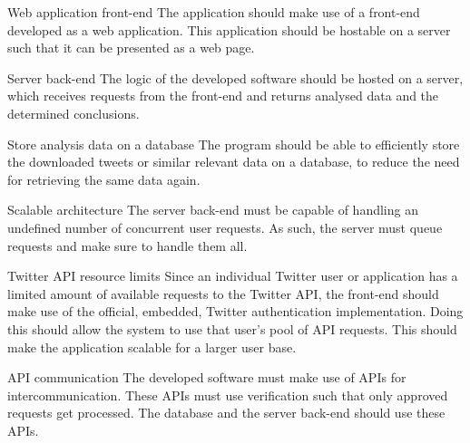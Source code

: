 \begin{requirement}{Web application front-end}
The application should make use of a front-end developed as a web application.
This application should be hostable on a server such that it can be presented as
a web page.
\end{requirement}

\begin{requirement}{Server back-end}
The logic of the developed software should be hosted on a server, which receives
requests from the front-end and returns analysed data and the determined
conclusions.
\end{requirement}

\begin{requirement}{Store analysis data on a database}
The program should be able to efficiently store the downloaded tweets or similar
relevant data on a database, to reduce the need for retrieving the same data
again.
\end{requirement}

\begin{requirement}{Scalable architecture}
The server back-end must be capable of handling an undefined number of
concurrent user requests. As such, the server must queue requests and make sure
to handle them all.
\end{requirement}

\begin{requirement}{Twitter API resource limits}
Since an individual Twitter user or application has a limited amount of
available requests to the Twitter API, the front-end should make use of the
official, embedded, Twitter authentication implementation. Doing this should
allow the system to use that user's pool of API requests. This should make the
application scalable for a larger user base.
\end{requirement}

\begin{requirement}{\ac{API} communication}
The developed software must make use of \ac{API}s for intercommunication. These
\ac{API}s must use verification such that only approved requests get processed.
The database and the server back-end should use these \ac{API}s.
\end{requirement}




